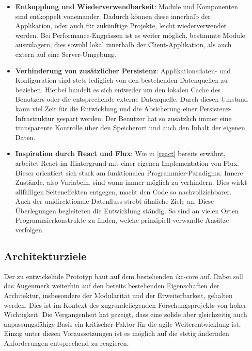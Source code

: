 \begin{itemize}
    \item \textbf{Entkopplung und Wiederverwendbarkeit}:
    Module und Komponenten sind entkoppelt voneinander. Dadurch können diese innerhalb der Applikation, oder auch für zukünftige Projekte, leicht wiederverwendet werden. Bei Performance-Engpässen ist es weiter möglich, bestimmte Module auszulagern, dies sowohl lokal innerhalb der Client-Applikation, als auch extern auf eine Server-Umgebung.
    \item \textbf{Verhinderung von zusätzlicher Persistenz}:
    Applikationsdaten- und Konfiguration sind stets lediglich von den bestehenden Datenquellen zu beziehen. Hierbei handelt es sich entweder um den lokalen Cache des Benutzers oder die entsprechende externe Datenquelle. Durch diesen Umstand kann viel Zeit für die Entwicklung und die Absicherung einer Persistenz-Infrastruktur gespart werden. Der Benutzer hat so zusätzlich immer eine transparente Kontrolle über den Speicherort und auch den Inhalt der eigenen Daten.
    \item \textbf{Inspiration durch React und Flux}: Wie in \autoref{react} bereits erwähnt, arbeitet React im Hintergrund mit einer eigenen Implementation von Flux. Dieser orientiert sich stark am funktionalen Programmier-Paradigma: Innere Zustände, also Variabeln, sind wann immer möglich zu verhindern. Dies wirkt allfälligen Seiteneffekten entgegen, macht den Code so nachvollziehbarer. Auch der unidirektionale Datenfluss strebt ähn\-liche Ziele an. Diese Überlegungen begleiteten die Entwicklung ständig. So sind an vielen Orten Programmierkonstrukte zu finden, welche prinzipiell verwandte Ansätze verfolgen.
\end{itemize}

\subsection{Architekturziele}

Der zu entwickelnde Prototyp baut auf dem bestehenden \gls{ikc-core} auf. Dabei soll das Augenmerk weiterhin auf den bereits bestehenden Eigenschaften der Architektur, insbesondere der Modularität und der Erweiterbarkeit, gehalten werden. Dies ist im Kontext des zugrundeliegenden Forschungsprojekts von hoher Wichtigkeit. Die Vergangenheit hat gezeigt, dass eine solide aber gleichzeitig auch anpassungsfähige Basis ein kritischer Faktor für die agile Weiterentwicklung ist. Einzig unter diesen Voraussetzungen ist es möglich auf die stetig ändernden Anforderungen entsprechend zu reagieren.

